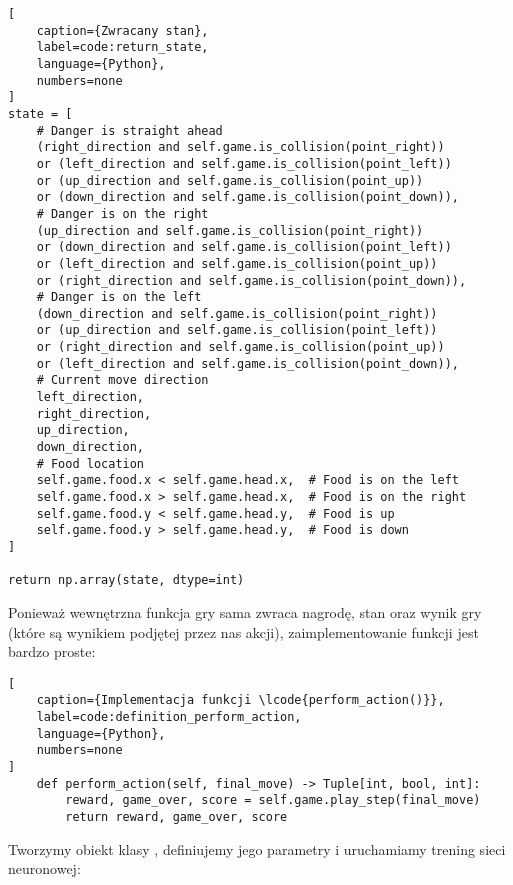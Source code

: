 \begin{onepage}
    \begin{lstlisting}[
    caption={Zwracany stan},
    label=code:return_state,
    language={Python},
    numbers=none
]
state = [
    # Danger is straight ahead
    (right_direction and self.game.is_collision(point_right))
    or (left_direction and self.game.is_collision(point_left))
    or (up_direction and self.game.is_collision(point_up))
    or (down_direction and self.game.is_collision(point_down)),
    # Danger is on the right
    (up_direction and self.game.is_collision(point_right))
    or (down_direction and self.game.is_collision(point_left))
    or (left_direction and self.game.is_collision(point_up))
    or (right_direction and self.game.is_collision(point_down)),
    # Danger is on the left
    (down_direction and self.game.is_collision(point_right))
    or (up_direction and self.game.is_collision(point_left))
    or (right_direction and self.game.is_collision(point_up))
    or (left_direction and self.game.is_collision(point_down)),
    # Current move direction
    left_direction,
    right_direction,
    up_direction,
    down_direction,
    # Food location
    self.game.food.x < self.game.head.x,  # Food is on the left
    self.game.food.x > self.game.head.x,  # Food is on the right
    self.game.food.y < self.game.head.y,  # Food is up
    self.game.food.y > self.game.head.y,  # Food is down
]

return np.array(state, dtype=int)
    \end{lstlisting}
\end{onepage}

\clearpage

Ponieważ wewnętrzna funkcja  gry sama zwraca nagrodę, stan oraz wynik gry (które są wynikiem podjętej przez nas akcji), zaimplementowanie funkcji  jest bardzo proste:


\begin{onepage}
    \begin{lstlisting}[
    caption={Implementacja funkcji \lcode{perform_action()}},
    label=code:definition_perform_action,
    language={Python},
    numbers=none
]
    def perform_action(self, final_move) -> Tuple[int, bool, int]:
        reward, game_over, score = self.game.play_step(final_move)
        return reward, game_over, score
    \end{lstlisting}
\end{onepage}


Tworzymy obiekt klasy , definiujemy jego parametry i uruchamiamy trening sieci neuronowej:

